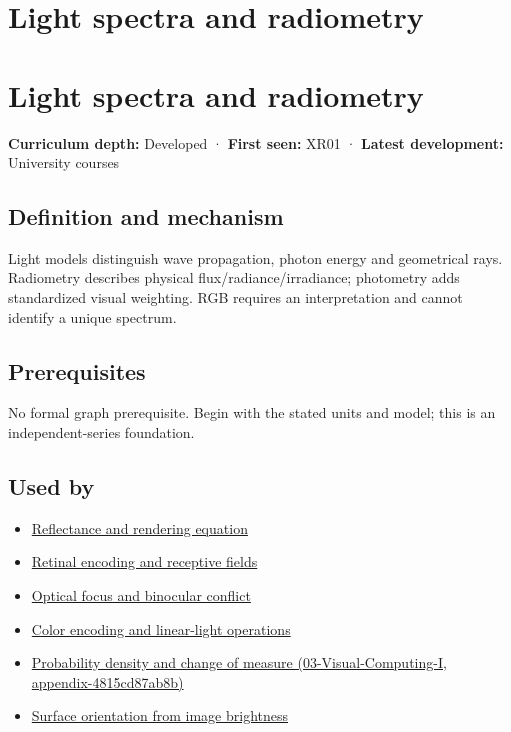 \hypertarget{appendix-215c2570199b}{}
\section*{Light spectra and radiometry}
\section{Light spectra and radiometry}\label{light-spectra-and-radiometry}

\textbf{Curriculum depth:} Developed · \textbf{First seen:} XR01 · \textbf{Latest development:} University courses

\subsection{Definition and mechanism}\label{definition-and-mechanism}

Light models distinguish wave propagation, photon energy and geometrical rays. Radiometry describes physical flux/radiance/irradiance; photometry adds standardized visual weighting. RGB requires an interpretation and cannot identify a unique spectrum.

\subsection{Prerequisites}\label{prerequisites}

No formal graph prerequisite. Begin with the stated units and model; this is an independent-series foundation.

\subsection{Used by}\label{used-by}

\begin{itemize}
\tightlist
\item
  \hyperref[appendix-96da0b153b77]{Reflectance and rendering equation}
\item
  \hyperref[appendix-7281c15ac44a]{Retinal encoding and receptive fields}
\item
  \hyperref[appendix-f90cee1be7a4]{Optical focus and binocular conflict}
\item
  \hyperref[appendix-a9f83ad40792]{Color encoding and linear-light operations}
\item
  \href{}{Probability density and change of measure (03-Visual-Computing-I, appendix-4815cd87ab8b)}
\item
  \hyperref[appendix-89b2d5b7c9e1]{Surface orientation from image brightness}
\end{itemize}

